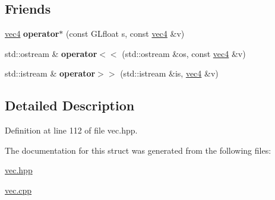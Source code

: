 \subsection*{Friends}
\begin{DoxyCompactItemize}
\item 
\hypertarget{struct_angel_1_1vec4_a18b1a91dc4c502220d099d6d85e504bc}{\hyperlink{struct_angel_1_1vec4}{vec4} {\bfseries operator$\ast$} (const G\-Lfloat s, const \hyperlink{struct_angel_1_1vec4}{vec4} \&v)}\label{struct_angel_1_1vec4_a18b1a91dc4c502220d099d6d85e504bc}

\item 
\hypertarget{struct_angel_1_1vec4_afadcf8884205c469256e4be7d96bfa12}{std\-::ostream \& {\bfseries operator$<$$<$} (std\-::ostream \&os, const \hyperlink{struct_angel_1_1vec4}{vec4} \&v)}\label{struct_angel_1_1vec4_afadcf8884205c469256e4be7d96bfa12}

\item 
\hypertarget{struct_angel_1_1vec4_ada396ae1c4ef513c6baf301f20f89bfa}{std\-::istream \& {\bfseries operator$>$$>$} (std\-::istream \&is, \hyperlink{struct_angel_1_1vec4}{vec4} \&v)}\label{struct_angel_1_1vec4_ada396ae1c4ef513c6baf301f20f89bfa}

\end{DoxyCompactItemize}


\subsection{Detailed Description}


Definition at line 112 of file vec.\-hpp.



The documentation for this struct was generated from the following files\-:\begin{DoxyCompactItemize}
\item 
\hyperlink{vec_8hpp}{vec.\-hpp}\item 
\hyperlink{vec_8cpp}{vec.\-cpp}\end{DoxyCompactItemize}
